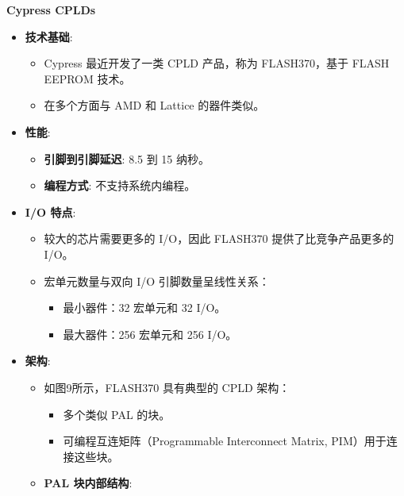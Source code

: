 \documentclass[
  ignorenonframetext,
  chinese,
]{beamer}
\providecommand{\tightlist}{%
  \setlength{\itemsep}{0pt}\setlength{\parskip}{0pt}}
\begin{document}
\begin{frame}
\begin{block}{\textbf{Cypress CPLDs}}
\label{cypress-cplds}
\begin{itemize}
\tightlist
\item
  \textbf{技术基础}:

  \begin{itemize}
  \tightlist
  \item
    Cypress 最近开发了一类 CPLD 产品，称为 FLASH370，基于 FLASH EEPROM
    技术。
  \item
    在多个方面与 AMD 和 Lattice 的器件类似。
  \end{itemize}
\item
  \textbf{性能}:

  \begin{itemize}
  \tightlist
  \item
    \textbf{引脚到引脚延迟}: 8.5 到 15 纳秒。
  \item
    \textbf{编程方式}: 不支持系统内编程。
  \end{itemize}
\item
  \textbf{I/O 特点}:

  \begin{itemize}
  \tightlist
  \item
    较大的芯片需要更多的 I/O，因此 FLASH370 提供了比竞争产品更多的 I/O。
  \item
    宏单元数量与双向 I/O 引脚数量呈线性关系：

    \begin{itemize}
    \tightlist
    \item
      最小器件：32 宏单元和 32 I/O。
    \item
      最大器件：256 宏单元和 256 I/O。
    \end{itemize}
  \end{itemize}
\item
  \textbf{架构}:

  \begin{itemize}
  \tightlist
  \item
    如图9所示，FLASH370 具有典型的 CPLD 架构：

    \begin{itemize}
    \tightlist
    \item
      多个类似 PAL 的块。
    \item
      可编程互连矩阵（Programmable Interconnect Matrix,
      PIM）用于连接这些块。
    \end{itemize}
  \item
    \textbf{PAL 块内部结构}:


\end{itemize}
\end{itemize}
\end{block}
\end{frame}
\end{document}
